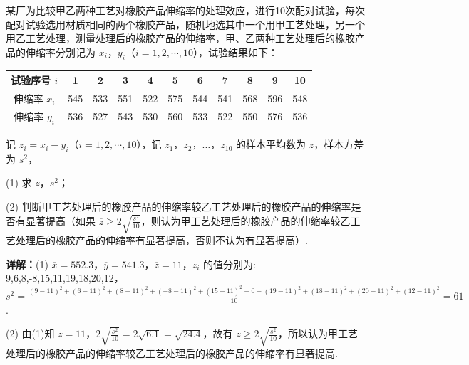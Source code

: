 \begin{question}[points=12]
某厂为比较甲乙两种工艺对橡胶产品伸缩率的处理效应，进行10次配对试验，每次配对试验选用材质相同的两个橡胶产品，随机地选其中一个用甲工艺处理，另一个用乙工艺处理，测量处理后的橡胶产品的伸缩率，甲、乙两种工艺处理后的橡胶产品的伸缩率分别记为 $x_i$，$y_i$（$i=1,2,\cdots,10$），试验结果如下：



\begin{tabular}{c|cccccccccc}

试验序号 $i$ & 1 & 2 & 3 & 4 & 5 & 6 & 7 & 8 & 9 & 10 \\ \hline

伸缩率 $x_i$ & 545 & 533 & 551 & 522 & 575 & 544 & 541 & 568 & 596 & 548 \\

伸缩率 $y_i$ & 536 & 527 & 543 & 530 & 560 & 533 & 522 & 550 & 576 & 536 \\

\end{tabular}



记 $z_i=x_i-y_i$（$i=1,2,\cdots,10$），记 $z_1$，$z_2$，$\ldots$，$z_{10}$ 的样本平均数为 $\overline{z}$，样本方差为 $s^2$，



(1) 求 $\overline{z}$，$s^2$；



(2) 判断甲工艺处理后的橡胶产品的伸缩率较乙工艺处理后的橡胶产品的伸缩率是否有显著提高（如果 $\overline{z}\ge 2\sqrt{\frac{s^2}{10}}$，则认为甲工艺处理后的橡胶产品的伸缩率较乙工艺处理后的橡胶产品的伸缩率有显著提高，否则不认为有显著提高）.
\begin{solution}

\textbf{详解：}(1) $\overline{x}=552.3$，$\overline{y}=541.3$，$\overline{z}=11$，$z_i$ 的值分别为: 9,6,8,-8,15,11,19,18,20,12，$s^2=\frac{(9-11)^2+(6-11)^2+(8-11)^2+(-8-11)^2+(15-11)^2+0+(19-11)^2+(18-11)^2+(20-11)^2+(12-11)^2}{10}=61$.

(2) 由(1)知 $\overline{z}=11$，$2\sqrt{\frac{s^2}{10}}=2\sqrt{6.1}=\sqrt{24.4}$，故有 $\overline{z}\ge 2\sqrt{\frac{s^2}{10}}$，所以认为甲工艺处理后的橡胶产品的伸缩率较乙工艺处理后的橡胶产品的伸缩率有显著提高.
\end{solution}
\end{question}

